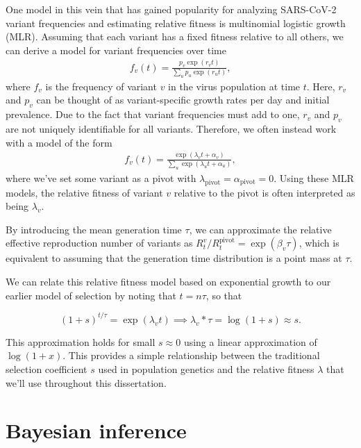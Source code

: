 One model in this vein that has gained popularity for analyzing SARS-CoV-2 variant frequencies and estimating relative fitness is multinomial logistic growth (MLR).
Assuming that each variant has a fixed fitness relative to all others, we can derive a model for variant frequencies over time
\begin{align}
f_{v}(t) = \frac{p_{v}\exp(r_{v}t)}{\sum_{u} p_{u} \exp(r_{u}t)},
\end{align}
where $f_{v}$ is the frequency of variant $v$ in the virus population at time $t$.
Here, $r_{v}$ and $p_{v}$ can be thought of as variant-specific growth rates per day and initial prevalence. 
Due to the fact that variant frequencies must add to one, $r_{v}$ and $p_{v}$ are not uniquely identifiable for all variants. 
Therefore, we often instead work with a model of the form
\begin{align}
f_{v}(t) = \frac{\exp(\lambda_{v} t + \alpha_{v})}{\sum_{u} \exp(\lambda_{u} t + \alpha_{u})},
\end{align}
where we've set some variant as a pivot with $\lambda_{\text{pivot}} = \alpha_{\text{pivot}}=0$.
Using these MLR models, the relative fitness of variant $v$ relative to the pivot is often interpreted as being $\lambda_{v}$.

By introducing the mean generation time $\tau$, we can approximate the relative effective reproduction number of variants as $R_{t}^{v} / R_{t}^{\text{pivot}} = \exp(\beta_{v}\tau)$, which is equivalent to assuming that the generation time distribution is a point mass at $\tau$.


We can relate this relative fitness model based on exponential growth to our earlier model of selection by noting that $t = n\tau$, so that

$$
(1 + s)^{t / \tau} = \exp(\lambda_v t) \implies \lambda_v * \tau = \log{(1 + s)} \approx s.
$$

This approximation holds for small $s \approx 0$ using a linear approximation of $\log(1+x)$.
This provides a simple relationship between the traditional selection coefficient $s$ used in population genetics and the relative fitness $\lambda$ that we'll use throughout this dissertation.

\section{Bayesian inference}%


